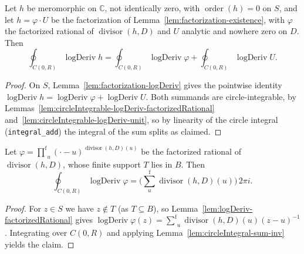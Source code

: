 \begin{lemma}
    \label{lem:argument-principle-integral-split}
    \leanok
    Let $h$ be meromorphic on $\mathbb{C}$, not identically zero, with
    $\operatorname{order}(h) = 0$ on $S$, and let $h = \varphi\cdot U$ be the
    factorization of Lemma~\ref{lem:factorization-existence}, with $\varphi$ the
    factorized rational of $\operatorname{divisor}(h,D)$ and $U$ analytic and
    nowhere zero on $D$. Then
    \[
        \oint_{C(0,R)}\operatorname{logDeriv} h
          = \oint_{C(0,R)}\operatorname{logDeriv}\varphi
          + \oint_{C(0,R)}\operatorname{logDeriv} U .
    \]
\end{lemma}
\begin{proof}
    On $S$, Lemma~\ref{lem:factorization-logDeriv} gives the pointwise identity
    $\operatorname{logDeriv} h = \operatorname{logDeriv}\varphi +
    \operatorname{logDeriv} U$. Both summands are circle-integrable, by
    Lemmas~\ref{lem:circleIntegrable-logDeriv-factorizedRational}
    and~\ref{lem:circleIntegrable-logDeriv-unit}, so by linearity of the circle
    integral (\texttt{integral\_add}) the integral of the sum splits as claimed.
\end{proof}

\begin{lemma}
    \label{lem:circleIntegral-logDeriv-factorizedRational}
    \leanok
    Let $\varphi = \operatorname*{{\textstyle\prod}^{\mathrm f}}_{u}
      (\cdot-u)^{\operatorname{divisor}(h,D)(u)}$ be the factorized rational of
    $\operatorname{divisor}(h,D)$, whose finite support $T$ lies in $B$. Then
    \[
        \oint_{C(0,R)}\operatorname{logDeriv}\varphi
          = \Big(\operatorname*{{\textstyle\sum}^{\mathrm f}}_{u}
            \operatorname{divisor}(h,D)(u)\Big)\, 2\pi i .
    \]
\end{lemma}
\begin{proof}
    For $z \in S$ we have $z \notin T$ (as $T \subseteq B$), so
    Lemma~\ref{lem:logDeriv-factorizedRational} gives
    $\operatorname{logDeriv}\varphi(z) =
    \operatorname*{{\textstyle\sum}^{\mathrm f}}_{u}
    \operatorname{divisor}(h,D)(u)(z-u)^{-1}$. Integrating over $C(0,R)$ and
    applying Lemma~\ref{lem:circleIntegral-sum-inv} yields the claim.
\end{proof}

